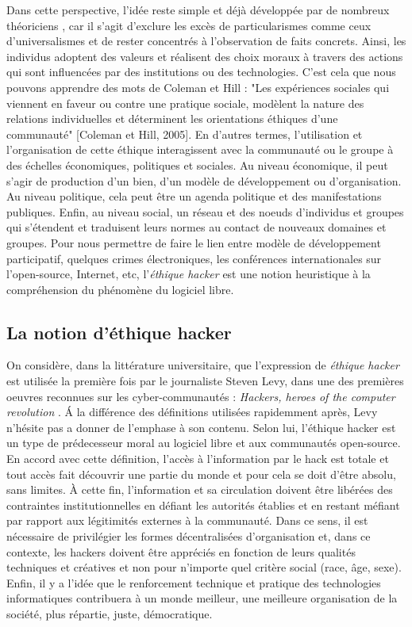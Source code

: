 Dans cette perspective, l'idée reste simple et déjà développée par de nombreux théoriciens \citep{Galison1997, Good1994, Guterson1996}, car il s'agit d'exclure les excès de particularismes comme ceux d'universalismes et de rester concentrés à l'observation de faits concrets. Ainsi, les individus adoptent des valeurs et réalisent des choix moraux à travers des actions qui sont influencées par des institutions ou des technologies. C'est cela que nous pouvons apprendre des mots de Coleman et Hill : "Les expériences sociales qui viennent en faveur ou contre une pratique sociale, modèlent la nature des relations individuelles et déterminent les orientations éthiques d'une communauté" [Coleman et Hill, 2005]. En d'autres termes, l'utilisation et l'organisation de cette éthique interagissent avec la communauté ou le groupe à des échelles économiques, politiques et sociales. Au niveau économique, il peut s'agir de production d'un bien, d'un modèle de développement ou d'organisation. Au niveau politique, cela peut être un agenda politique et des manifestations publiques. Enfin, au niveau social, un réseau et des noeuds d'individus et groupes qui s'étendent et traduisent leurs normes au contact de nouveaux domaines et groupes. Pour nous permettre de faire le lien entre modèle de développement participatif, quelques crimes électroniques, les conférences internationales sur l'open-source, Internet, etc, l'\emph{éthique hacker} est une notion heuristique à la compréhension du phénomène du logiciel libre.

\subsection{La notion d'éthique hacker} \label{2.1.3}

On considère, dans la littérature universitaire, que l'expression de \emph{éthique hacker} est utilisée la première fois par le journaliste Steven Levy, dans une des premières oeuvres reconnues sur les cyber-communautés : \emph{Hackers, heroes of the computer revolution} \citep{Levy1984}. \'A la différence des définitions utilisées rapidemment après, Levy n'hésite pas a donner de l'emphase à son contenu. Selon lui, l'éthique hacker est un type de prédecesseur moral au logiciel libre et aux communautés open-source. En accord avec cette définition, l'accès à l'information par le hack est totale et tout accès fait découvrir une partie du monde et pour cela se doit d'être absolu, sans limites. \`A cette fin, l'information et sa circulation doivent être libérées des contraintes institutionnelles en défiant les autorités établies et en restant méfiant par rapport aux légitimités externes à la communauté. Dans ce sens, il est nécessaire de privilégier les formes décentralisées d'organisation et, dans ce contexte, les hackers doivent être appréciés en fonction de leurs qualités techniques et créatives et non pour n'importe quel critère social (race, âge, sexe). Enfin, il y a l'idée que le renforcement technique et pratique des technologies informatiques contribuera à un monde meilleur, une meilleure organisation de la société, plus répartie, juste, démocratique.

